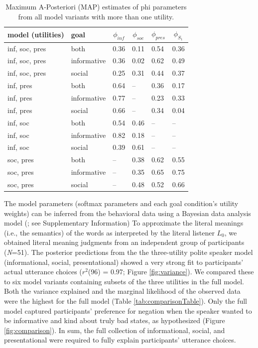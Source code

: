 \documentclass[9pt,twocolumn,twoside,lineno]{main_class_file}
\begin{document}
\begin{table}[tbp]
\begin{center}
\begin{threeparttable}
\caption{\label{tab:phi}Maximum A-Posteriori (MAP) estimates of phi parameters from all model variants with more than one utility.}
\begin{tabularx}{\columnwidth}{llllll}
\toprule
model (utilities) & \multicolumn{1}{l}{goal} & \multicolumn{1}{c}{$\phi_{inf}$} & \multicolumn{1}{c}{$\phi_{soc}$} & \multicolumn{1}{c}{$\phi_{pres}$} & \multicolumn{1}{c}{$\phi_{S_1}$}\\
\midrule
inf, soc, pres & both & 0.36 & 0.11 & 0.54 & 0.36\\
inf, soc, pres & informative & 0.36 & 0.02 & 0.62 & 0.49\\
inf, soc, pres & social & 0.25 & 0.31 & 0.44 & 0.37\\
inf, pres & both & 0.64 & -- & 0.36 & 0.17\\
inf, pres & informative & 0.77 & -- & 0.23 & 0.33\\
inf, pres & social & 0.66 & -- & 0.34 & 0.04\\
inf, soc & both & 0.54 & 0.46 & -- & --\\
inf, soc & informative & 0.82 & 0.18 & -- & --\\
inf, soc & social & 0.39 & 0.61 & -- & --\\
soc, pres & both & -- & 0.38 & 0.62 & 0.55\\
soc, pres & informative & -- & 0.35 & 0.65 & 0.75\\
soc, pres & social & -- & 0.48 & 0.52 & 0.66\\
\bottomrule
\end{tabularx}
\end{threeparttable}
\end{center}
\end{table}



The model parameters (softmax parameters and each goal condition's utility weights) can be inferred from the behavioral data using a Bayesian data analysis model (\cite{lee2014}; see Supplementary Information)
To approximate the literal meanings (i.e., the semantics) of the words as interpreted by the literal listener \(L_0\), we obtained literal meaning judgments from an independent group of participants
(\emph{N}=51).
The posterior predictions from the the three-utility polite speaker model (informational, social, presentational) showed a very strong fit to participants' actual utterance choices (\(r^2\)(96) = 0.97; Figure \ref{fig:variance}).
We compared these to six model variants containing
subsets of the three utilities in the full model.
Both the variance explained and the marginal likelihood of the observed data were the
highest for the full model (Table \ref{tab:comparisonTable}). Only the
full model captured participants' preference for negation when the speaker wanted to be informative and kind
about truly bad states, as hypothesized (Figure \ref{fig:comparison}).
In sum, the full collection of informational, social, and presentational were
required to fully explain participants' utterance choices.
\end{document}
